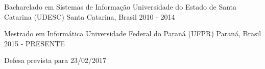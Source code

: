

\begin{cventries}

  \cventry
    {Bacharelado em Sistemas de Informação} %
    {Universidade do Estado de Santa Catarina (UDESC)} %
    {Santa Catarina, Brasil} %
    {2010 - 2014} %
    {
    }

  \cventry
	{Mestrado em Informática} %
	{Universidade Federal do Paraná (UFPR)} %
	{Paraná, Brasil} %
	{2015 - PRESENTE} %
	{
		\begin{cvitems} %
			\item {Defesa prevista para 23/02/2017}
		\end{cvitems}
	}
	

\end{cventries}
